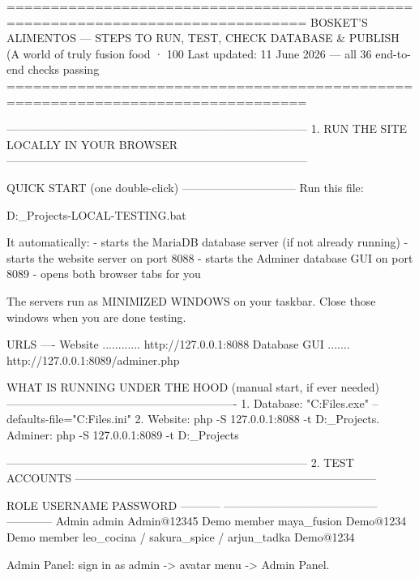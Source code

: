 ================================================================================
 BOSKET'S ALIMENTOS — STEPS TO RUN, TEST, CHECK DATABASE & PUBLISH
 (A world of truly fusion food · 100%
 Last updated: 11 June 2026 — all 36 end-to-end checks passing
================================================================================


--------------------------------------------------------------------------------
 1. RUN THE SITE LOCALLY IN YOUR BROWSER
--------------------------------------------------------------------------------

QUICK START (one double-click)
------------------------------
Run this file:

    D:\Ketul\Claude_Projects\BosketsAlimentosTools\START-LOCAL-TESTING.bat

It automatically:
  - starts the MariaDB database server (if not already running)
  - starts the website server on port 8088
  - starts the Adminer database GUI on port 8089
  - opens both browser tabs for you

The servers run as MINIMIZED WINDOWS on your taskbar.
Close those windows when you are done testing.

URLS
----
  Website ............ http://127.0.0.1:8088
  Database GUI ....... http://127.0.0.1:8089/adminer.php

WHAT IS RUNNING UNDER THE HOOD (manual start, if ever needed)
-------------------------------------------------------------
  1. Database:
     "C:\Program Files\bin\mariadbd.exe"
         --defaults-file="C:\Program Files\data\my.ini"
  2. Website:
     php -S 127.0.0.1:8088 -t D:\Ketul\Claude_Projects. Adminer:
     php -S 127.0.0.1:8089 -t D:\Ketul\Claude_Projects\BosketsAlimentosTools


--------------------------------------------------------------------------------
 2. TEST ACCOUNTS
--------------------------------------------------------------------------------

  ROLE         USERNAME                                   PASSWORD
  -----------  -----------------------------------------  ------------
  Admin        admin                                      Admin@12345
  Demo member  maya_fusion                                Demo@1234
  Demo member  leo_cocina / sakura_spice / arjun_tadka    Demo@1234

  Admin Panel: sign in as admin -> avatar menu -> Admin Panel.


